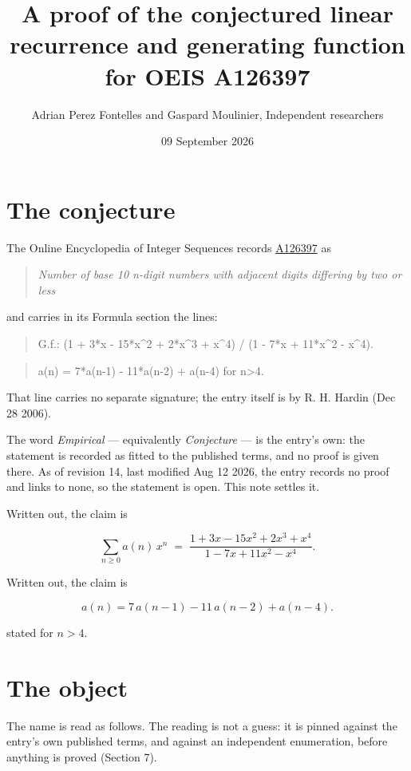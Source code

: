 \documentclass[11pt]{article}
\title{A proof of the conjectured linear recurrence and generating function for OEIS A126397}
\author{Adrian Perez Fontelles and Gaspard Moulinier, Independent researchers}
\date{09 September 2026}
\theoremstyle{definition}
\begin{document}
\maketitle
\section{The conjecture}

The Online Encyclopedia of Integer Sequences records \href{https://oeis.org/A126397}{A126397} as

\begin{quote}\itshape Number of base 10 n-digit numbers with adjacent digits differing by two or less\end{quote}

and carries in its Formula section the lines:

\begin{quote}\ttfamily G.f.: (1 + 3*x - 15*x\textasciicircum{}2 + 2*x\textasciicircum{}3 + x\textasciicircum{}4) / (1 - 7*x + 11*x\textasciicircum{}2 - x\textasciicircum{}4).\end{quote}

\begin{quote}\ttfamily a(n) = 7*a(n-1) - 11*a(n-2) + a(n-4) for n>4.\end{quote}

That line carries no separate signature; the entry itself is by R. H. Hardin (Dec 28 2006).

The word {\itshape Empirical} --- equivalently {\itshape Conjecture} --- is the entry's own: the statement is recorded as fitted to the published terms, and no proof is given there. As of revision 14, last modified Aug 12 2026, the entry records no proof and links to none, so the statement is open. This note settles it.

Written out, the claim is

\[\sum_{n \ge 0} a(n)\,x^n \;=\; \frac{1 + 3x - 15x^{2} + 2x^{3} + x^{4}}{1 - 7x + 11x^{2} - x^{4}}.\]

Written out, the claim is

\[a(n) = 7\,a(n-1) - 11\,a(n-2) + a(n-4).\]

stated for $n > 4$.

\section{The object}

The name is read as follows. The reading is not a guess: it is pinned against the entry's own published terms, and against an independent enumeration, before anything is proved (Section 7).
\end{document}
